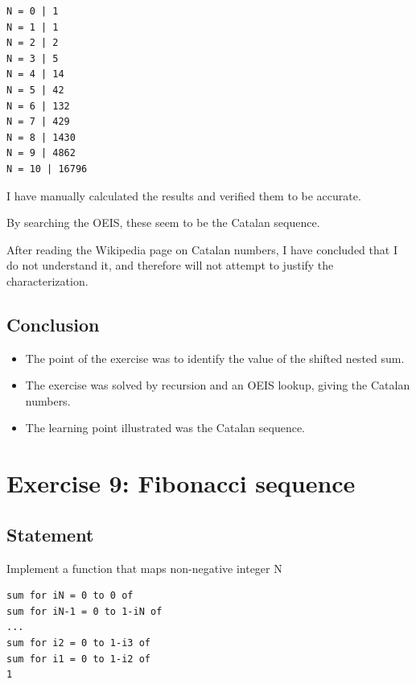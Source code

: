 \documentclass[12pt]{article}
\begin{document}
\begin{verbatim}
N = 0 | 1
N = 1 | 1
N = 2 | 2
N = 3 | 5
N = 4 | 14
N = 5 | 42
N = 6 | 132
N = 7 | 429
N = 8 | 1430
N = 9 | 4862
N = 10 | 16796
\end{verbatim}

I have manually calculated the results and verified them to be accurate.

By searching the OEIS, these seem to be the Catalan sequence.

After reading the Wikipedia page on Catalan numbers, I have concluded that I do
not understand it, and therefore will not attempt to justify the
characterization.


\subsection{Conclusion}

\begin{itemize}

\item
  The point of the exercise was to identify the value of the shifted nested sum.

\item
  The exercise was solved by recursion and an OEIS lookup, giving the Catalan numbers.

\item
  The learning point illustrated was the Catalan sequence.

\end{itemize}


\newpage

\section{Exercise 9: Fibonacci sequence}


\subsection{Statement}

Implement a function that maps non-negative integer N

\begin{verbatim}
sum for iN = 0 to 0 of
sum for iN-1 = 0 to 1-iN of
...
sum for i2 = 0 to 1-i3 of
sum for i1 = 0 to 1-i2 of
1
\end{verbatim}
\end{document}
